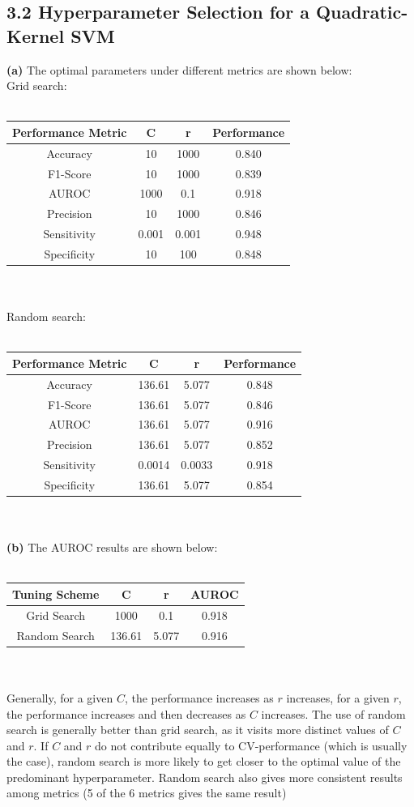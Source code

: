 \documentclass{article}
\begin{document}
\subsection*{3.2 Hyperparameter Selection for a Quadratic-Kernel SVM}
\textbf{(a)} The optimal parameters under different metrics are shown below:\\ Grid search: \\\\
\begin{tabular}{|c|c|c|c|}
\hline
\bf Performance Metric & \bf C & \bf r & \bf Performance \\ \hline
Accuracy & 10 & 1000 & 0.840 \\ \hline
F1-Score & 10 & 1000 & 0.839 \\ \hline
AUROC & 1000 & 0.1 & 0.918 \\ \hline
Precision & 10 & 1000 & 0.846 \\ \hline
Sensitivity & 0.001 & 0.001 & 0.948 \\ \hline
Specificity & 10 & 100 & 0.848 \\ \hline
\end{tabular}\\ \\
Random search: \\\\
\begin{tabular}{|c|c|c|c|}
\hline
\bf Performance Metric & \bf C & \bf r & \bf Performance \\ \hline
Accuracy & 136.61 & 5.077 & 0.848 \\ \hline
F1-Score & 136.61 & 5.077 & 0.846 \\ \hline
AUROC & 136.61 & 5.077 & 0.916 \\ \hline
Precision & 136.61 & 5.077 & 0.852 \\ \hline
Sensitivity & 0.0014 & 0.0033 & 0.918 \\ \hline
Specificity & 136.61 & 5.077 & 0.854 \\ \hline
\end{tabular}\\ \\
\textbf{(b)} The AUROC results are shown below:\\\\
\begin{tabular}{|c|c|c|c|}
\hline
\bf Tuning Scheme & \bf C & \bf r & \bf AUROC \\ \hline
Grid Search & 1000 & 0.1 & 0.918 \\ \hline
Random Search & 136.61 & 5.077 & 0.916\\ \hline
\end{tabular}\\\\
\indent Generally, for a given $C$, the performance increases as $r$ increases,
for a given $r$, the performance increases and then decreases as $C$ increases.
The use of random search is generally better than grid search,
as it visits more distinct values of $C$ and $r$.
If $C$ and $r$ do not contribute equally to CV-performance
(which is usually the case), random search is more likely to get closer to
the optimal value of the predominant hyperparameter. Random search also gives more consistent results among metrics
(5 of the 6 metrics gives the same result)
\end{document}

